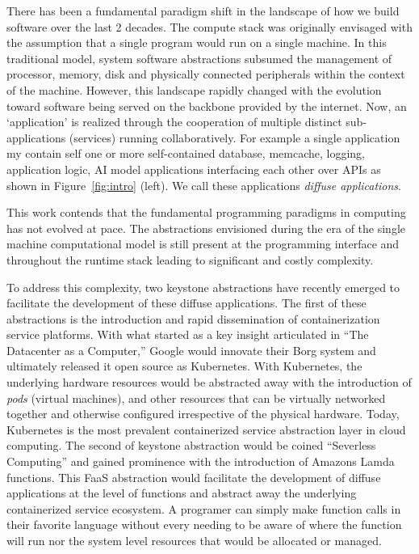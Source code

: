 There has been a fundamental paradigm shift in the landscape of how we build software over the last 2 decades.
The compute stack was originally envisaged with the assumption that a single program would run on a single machine.
In this traditional model, system software abstractions subsumed the management of processor, memory, disk and physically connected peripherals within the context of the machine.
However, this landscape rapidly changed with the evolution toward software being served on the backbone provided by the internet.
Now, an `application' is realized through the cooperation of multiple distinct sub-applications (services) running collaboratively.
For example a single application my contain self one or more self-contained database, memcache, logging, application logic, AI model applications interfacing each other over APIs as shown in Figure~\ref{fig:intro} (left).
We call these applications \emph{diffuse applications}.


This work contends that the fundamental programming paradigms in computing has not evolved at pace.
The abstractions envisioned during the era of the single machine computational model is still present at the programming interface and throughout the runtime stack leading to significant and costly complexity.


To address this complexity, two keystone abstractions have recently emerged to facilitate the development of these diffuse applications.
The first of these abstractions is the introduction and rapid dissemination of containerization service platforms.
With what started as a key insight articulated in ``The Datacenter as a Computer,'' Google would innovate their Borg system and ultimately released it open source as Kubernetes.
With Kubernetes, the underlying hardware resources would be abstracted away with the introduction of \emph{pods} (virtual machines), and other resources that can be virtually networked together and otherwise configured irrespective of the physical hardware.
Today, Kubernetes is the most prevalent containerized service abstraction layer in cloud computing.
The second of keystone abstraction would be coined ``Severless Computing'' and gained prominence with the introduction of Amazons Lamda functions.
This FaaS abstraction would facilitate the development of diffuse applications at the level of functions and abstract away the underlying containerized service ecosystem.
A programer can simply make function calls in their favorite language without every needing to be aware of where the function will run nor the system level resources that would be allocated or managed.

